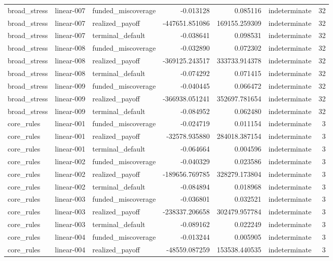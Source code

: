 \begin{tabular}{lllrrlr}
broad\_stress & linear-007 & funded\_miscoverage & -0.013128 & 0.085116 & indeterminate & 32 \\
broad\_stress & linear-007 & realized\_payoff & -447651.851086 & 169155.259309 & indeterminate & 32 \\
broad\_stress & linear-007 & terminal\_default & -0.038641 & 0.098531 & indeterminate & 32 \\
broad\_stress & linear-008 & funded\_miscoverage & -0.032890 & 0.072302 & indeterminate & 32 \\
broad\_stress & linear-008 & realized\_payoff & -369125.243517 & 333733.914378 & indeterminate & 32 \\
broad\_stress & linear-008 & terminal\_default & -0.074292 & 0.071415 & indeterminate & 32 \\
broad\_stress & linear-009 & funded\_miscoverage & -0.040445 & 0.066472 & indeterminate & 32 \\
broad\_stress & linear-009 & realized\_payoff & -366938.051241 & 352697.781654 & indeterminate & 32 \\
broad\_stress & linear-009 & terminal\_default & -0.084952 & 0.062480 & indeterminate & 32 \\
core\_rules & linear-001 & funded\_miscoverage & -0.024719 & 0.011154 & indeterminate & 3 \\
core\_rules & linear-001 & realized\_payoff & -32578.935880 & 284018.387154 & indeterminate & 3 \\
core\_rules & linear-001 & terminal\_default & -0.064664 & 0.004596 & indeterminate & 3 \\
core\_rules & linear-002 & funded\_miscoverage & -0.040329 & 0.023586 & indeterminate & 3 \\
core\_rules & linear-002 & realized\_payoff & -189656.769785 & 328279.173804 & indeterminate & 3 \\
core\_rules & linear-002 & terminal\_default & -0.084894 & 0.018968 & indeterminate & 3 \\
core\_rules & linear-003 & funded\_miscoverage & -0.036801 & 0.032521 & indeterminate & 3 \\
core\_rules & linear-003 & realized\_payoff & -238337.206658 & 302479.957784 & indeterminate & 3 \\
core\_rules & linear-003 & terminal\_default & -0.089162 & 0.022249 & indeterminate & 3 \\
core\_rules & linear-004 & funded\_miscoverage & -0.013244 & 0.005905 & indeterminate & 3 \\
core\_rules & linear-004 & realized\_payoff & -48559.087259 & 153538.440535 & indeterminate & 3 \\

\end{tabular}
